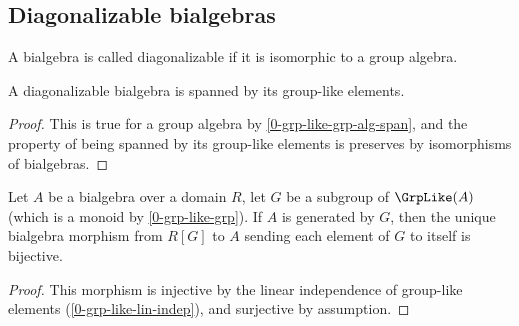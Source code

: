 \subsection{Diagonalizable bialgebras}


\begin{definition}
  \label{0-is-diag-bialg}
  \uses{}
  \leanok

  A bialgebra is called diagonalizable if it is isomorphic to a group algebra.
\end{definition}


\begin{lemma}
  \label{0-is-diag-bialg-group-like-span}
  \leanok

  A diagonalizable bialgebra is spanned by its group-like elements.
\end{lemma}
\begin{proof}
  \leanok

  This is true for a group algebra by \ref{0-grp-like-grp-alg-span}, and the
  property of being spanned by its group-like elements is preserves by
  isomorphisms of bialgebras.
\end{proof}


\begin{proposition}
  \label{0-bialg-bij-of-span-grp-like}

  Let $A$ be a bialgebra over a domain $R$,
  let $G$ be a subgroup of $\GrpLike(A)$ (which is a monoid by \ref{0-grp-like-grp}).
  If $A$ is generated by $G$,
  then the unique bialgebra morphism from $R[G]$ to $A$
  sending each element of $G$ to itself is bijective.
\end{proposition}
\begin{proof}
  \leanok

  This morphism is injective by the linear independence of group-like elements
  (\ref{0-grp-like-lin-indep}), and surjective by assumption.
\end{proof}


